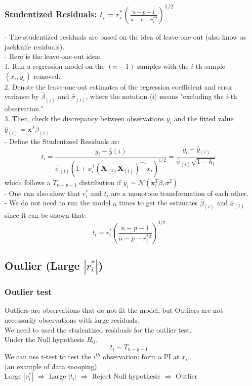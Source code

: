 \documentclass[11pt,a4paper]{article}
\begin{document}
\subsubsection{Studentized Residuals: $
t_{i}=r_{i}^{*}\left(\frac{n-p-1}{n-p-r_{i}^{* 2}}\right)^{1 / 2}
$}
- The studentized residuals are based on the idea of leave-one-out (also know as jackknife residuals).\\
- Here is the leave-one-out idea:\\
1. Run a regression model on the $(n-1)$ samples with the $i$-th sample $\left(x_{i}, y_{i}\right)$ removed.\\
2. Denote the leave-one-out estimates of the regression coefficient and error variance by $\hat{\beta}_{(i)}$ and $\hat{\sigma}_{(i)}$, where the notation (i) means "excluding the $i$-th observation."\\
3. Then, check the discrepancy between observations $y_{i}$ and the fitted value $\hat{y}_{(i)}=\mathbf{x}^{T} \hat{\beta}_{(i)}$\\
- Define the Studentized Residuals as:
$$
t_{i}=\frac{y_{i}-\hat{y}(i)}{\hat{\sigma}_{(i)}\left(1+x_{i}^{T}\left(\mathbf{X}_{(\mathbf{i})}^{\top} \mathbf{X}_{(i)}\right)^{-1} x_{i}\right)^{1 / 2}}=\frac{y_{i}-\hat{y}_{(i)}}{\hat{\sigma}_{(i)} \sqrt{1-h_{i}}}
$$
which follows a $T_{n-p-1}$ distribution if $y_{i} \sim \mathcal{N}\left(\mathbf{x}_{i}^{T} \beta, \sigma^{2}\right)$\\
- One can also show that $r_{i}^{*}$ and $t_{i}$ are a monotone transformation of each other.\\
- We do not need to run the model $n$ times to get the estimates $\hat{\beta}_{(i)}$ and $\hat{\sigma}_{(i)}$ since it can be shown that:
$$
t_{i}=r_{i}^{*}\left(\frac{n-p-1}{n-p-r_{i}^{* 2}}\right)^{1 / 2}
$$

\subsection{Outlier (Large $|r_i^*|$)}
\subsubsection{Outlier test}
Outliers are observations that do not ﬁt the model, but Outliers are not necessarily observations with large residuals.\\
We need to used the studentized residuals for the outlier test.\\
Under the Null hypothesis $H_0$,
$$t_i\sim T_{n-p-1}$$
We can use t-test to test the $i^{th}$ observation: form a PI at $x_i$.\\
(an example of data snooping)\\
Large $|r_i^*|$ $\Rightarrow$ Large $|t_i|$ $\Rightarrow$ Reject Null hypothesis $\Rightarrow$ Outlier
\end{document}
